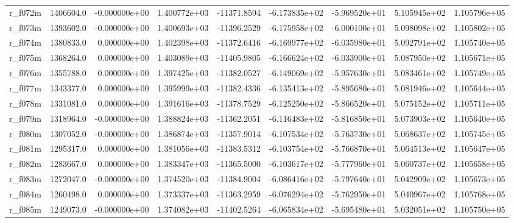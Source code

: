 \documentclass[12pt]{article}
\begin{document}
\begin{landscape}
\begin{longtable}{|l|r|r|r|r|r|r|r|r|}
r\_f072m                 &  1406604.0 & -0.000000e+00 &  1.400772e+03 & -11371.8594 & -6.173835e+02 & -5.969520e+01 &  5.105945e+02 &  1.105796e+05 \\
r\_f073m                 &  1393602.0 & -0.000000e+00 &  1.400693e+03 & -11396.2529 & -6.175958e+02 & -6.000100e+01 &  5.098098e+02 &  1.105802e+05 \\
r\_f074m                 &  1380833.0 &  0.000000e+00 &  1.402398e+03 & -11372.6416 & -6.169977e+02 & -6.035980e+01 &  5.092791e+02 &  1.105740e+05 \\
r\_f075m                 &  1368264.0 &  0.000000e+00 &  1.403089e+03 & -11405.9805 & -6.166624e+02 & -6.033900e+01 &  5.087950e+02 &  1.105671e+05 \\
r\_f076m                 &  1355788.0 &  0.000000e+00 &  1.397425e+03 & -11382.0527 & -6.149069e+02 & -5.957630e+01 &  5.083461e+02 &  1.105749e+05 \\
r\_f077m                 &  1343377.0 &  0.000000e+00 &  1.395999e+03 & -11382.4336 & -6.135413e+02 & -5.895680e+01 &  5.081946e+02 &  1.105644e+05 \\
r\_f078m                 &  1331081.0 &  0.000000e+00 &  1.391616e+03 & -11378.7529 & -6.125250e+02 & -5.866520e+01 &  5.075152e+02 &  1.105711e+05 \\
r\_f079m                 &  1318964.0 & -0.000000e+00 &  1.388824e+03 & -11362.2051 & -6.116483e+02 & -5.816850e+01 &  5.073903e+02 &  1.105640e+05 \\
r\_f080m                 &  1307052.0 & -0.000000e+00 &  1.386874e+03 & -11357.9014 & -6.107534e+02 & -5.763730e+01 &  5.068637e+02 &  1.105745e+05 \\
r\_f081m                 &  1295317.0 &  0.000000e+00 &  1.381056e+03 & -11383.5312 & -6.103754e+02 & -5.766870e+01 &  5.064513e+02 &  1.105647e+05 \\
r\_f082m                 &  1283667.0 &  0.000000e+00 &  1.383347e+03 & -11365.5000 & -6.103617e+02 & -5.777960e+01 &  5.060737e+02 &  1.105658e+05 \\
r\_f083m                 &  1272047.0 & -0.000000e+00 &  1.374520e+03 & -11384.9004 & -6.086416e+02 & -5.797640e+01 &  5.042909e+02 &  1.105673e+05 \\
r\_f084m                 &  1260498.0 &  0.000000e+00 &  1.373337e+03 & -11363.2959 & -6.076294e+02 & -5.762950e+01 &  5.040967e+02 &  1.105768e+05 \\
r\_f085m                 &  1249073.0 & -0.000000e+00 &  1.374082e+03 & -11402.5264 & -6.065834e+02 & -5.695480e+01 &  5.032051e+02 &  1.105750e+05 \\

\end{longtable}
\end{landscape}
\end{document}
